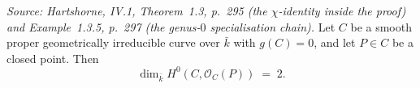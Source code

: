 \begin{theorem}



\leanok
[\(\dim_{\bar k} H^0(C, \mathcal O_C(P)) = 2\) on a genus-\(0\) curve]
  \label{thm:lineBundleAtClosedPoint_dim_eq_two_of_genusZero}

  \textit{Source: Hartshorne, IV.1, Theorem~1.3, p.~295 (the
  \(\chi\)-identity inside the proof) and Example~1.3.5, p.~297 (the
  genus-\(0\) specialisation chain).}
  Let \(C\) be a smooth proper geometrically irreducible curve over
  \(\bar k\) with \(g(C) = 0\), and let \(P \in C\) be a closed point. Then
  \[
    \dim_{\bar k} H^0(C, \mathcal O_C(P)) \;=\; 2.
  \]
\end{theorem}

